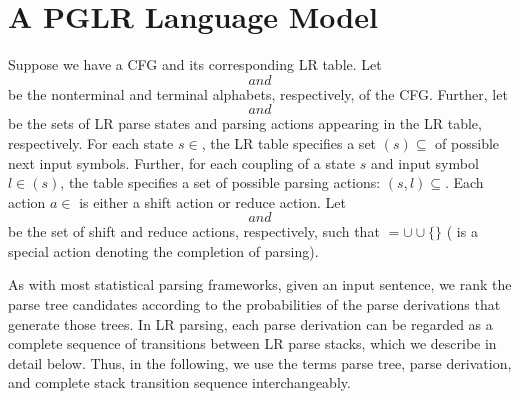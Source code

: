 \documentclass[a4j]{article}
\def\La{}
\def\Act{}
\def\acc{}
\def\Vt{}
\def\Vn{}
\def\AS{}
\def\As{}
\def\Ar{}
\def\SS{}
\begin{document}
\section{A PGLR Language Model}
\label{sec:PGLR}

Suppose we have a CFG and its corresponding LR table. Let $\Vn$ and
$\Vt$ be the nonterminal and terminal alphabets, respectively, of the
CFG. Further, let $\SS$ and $\AS$ be the sets of LR parse states and
parsing actions appearing in the LR table, respectively. For each state
$s\in\SS$, the LR table specifies a set $\La(s)\subseteq\Vt$ of possible
next input symbols. Further, for each coupling of a state $s$ and input
symbol $l\in\La(s)$, the table specifies a set of possible parsing
actions: $\Act(s,l)\subseteq\AS$. Each action $a\in\AS$ is either a
shift action or reduce action. Let $\As$ and $\Ar$ be the set of shift
and reduce actions, respectively, such that $\AS=\As\cup\Ar\cup\{\acc\}$
($\acc$ is a special action denoting the completion of parsing).


As with most statistical parsing frameworks, given an input sentence, we
rank the parse tree candidates according to the probabilities of the
parse derivations that generate those trees. In LR parsing, each parse
derivation can be regarded as a complete sequence of transitions between
LR parse stacks, which we describe in detail below. Thus, in the
following, we use the terms parse tree, parse derivation, and complete
stack transition sequence interchangeably.
\end{document}
